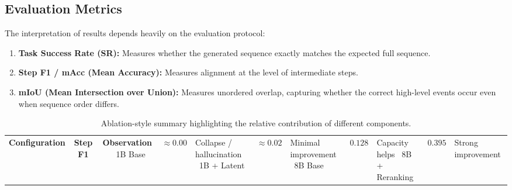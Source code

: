 \documentclass{article}
\begin{document}
\subsection{Evaluation Metrics}
The interpretation of results depends heavily on the evaluation protocol:
\begin{enumerate}
    \item \textbf{Task Success Rate (SR):} Measures whether the generated sequence exactly matches the expected full sequence.
    \item \textbf{Step F1 / mAcc (Mean Accuracy):} Measures alignment at the level of intermediate steps.
    \item \textbf{mIoU (Mean Intersection over Union):} Measures unordered overlap, capturing whether the correct high-level events occur even when sequence order differs.
\end{enumerate}

\begin{table}[h]
\centering
\caption{Zero-Shot Performance across unknown procedural configurations on the strictly isolated COIN evaluation suite. Scaling to an 8B capability alongside Critic-Goal Reranking unlocks relative performance gains.}
\label{tab:evaluation}
\end{table}
\begin{table}[h]
\centering
\caption{Ablation-style summary highlighting the relative contribution of different components.}
\label{tab:ablation}
\begin{tabular}{l c c}
\toprule
\textbf{Configuration} & \textbf{Step F1} & \textbf{Observation} \
\midrule
1B Base & $\approx 0.00$ & Collapse / hallucination \
1B + Latent & $\approx 0.02$ & Minimal improvement \
8B Base & $0.128$ & Capacity helps \
8B + Reranking & $0.395$ & Strong improvement \
\bottomrule
\end{tabular}
\end{table}
\end{document}
